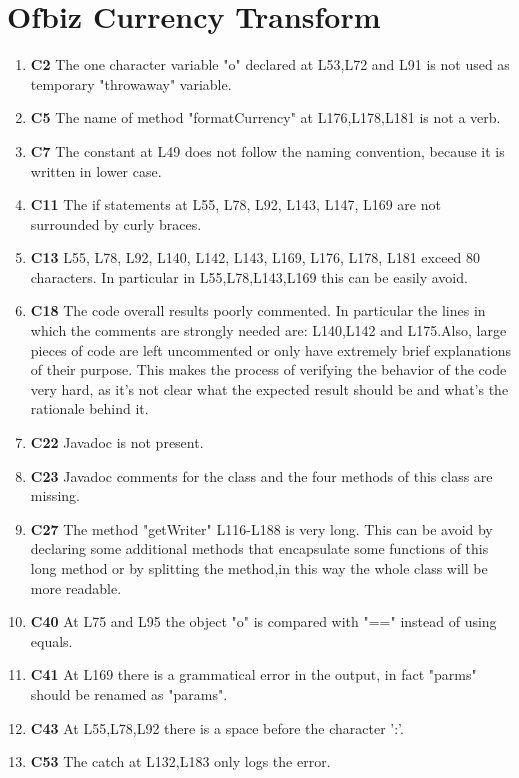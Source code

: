 \section{Ofbiz Currency Transform}

\begin{enumerate}
\item \textbf{C2} The one character variable "o" declared at L53,L72 and L91 is not used as temporary "throwaway" variable.
\item \textbf{C5} The name of method "formatCurrency" at L176,L178,L181 is not a verb.
\item \textbf{C7} The constant at L49 does not follow the naming convention, because it is written in lower case.
\item \textbf{C11} The if statements at L55, L78, L92, L143, L147, L169 are not surrounded by curly braces.
\item \textbf{C13} L55, L78, L92, L140, L142, L143, L169, L176, L178, L181 exceed 80 characters. In particular in L55,L78,L143,L169 this can be easily avoid.
\item \textbf{C18} The code overall results poorly commented. In particular the lines in which the comments are strongly needed are: L140,L142 and L175.Also, large pieces of code are left uncommented or only have extremely brief explanations of their purpose. This makes the process of verifying the behavior of the code very hard, as it’s not clear what the expected result should be and what’s the rationale behind it.
\item \textbf{C22} Javadoc is not present.
\item \textbf{C23} Javadoc comments for the class and the four methods of this class are missing.
\item \textbf{C27} The method "getWriter" L116-L188 is very long. This can be avoid by declaring some additional methods that encapsulate some functions of this long method or by splitting the method,in this way the whole class will be more readable.
\item \textbf{C40} At L75 and L95 the object "o" is compared with "==" instead of using equals.
\item \textbf{C41} At L169 there is a grammatical error in the output, in fact "parms" should be renamed as "params".
\item \textbf{C43} At L55,L78,L92 there is a space before the character ':'.
\item \textbf{C53} The catch at L132,L183 only logs the error.
\end{enumerate}